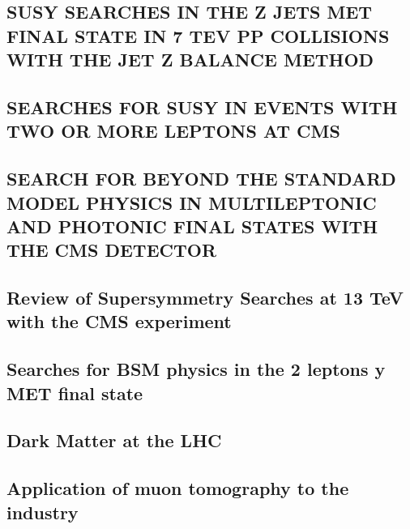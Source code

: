 \documentclass[a4paper, 11pt, twoside, openright]{report}
\begin{document}
\subsection{SUSY SEARCHES IN THE Z JETS MET FINAL STATE IN 7 TEV PP COLLISIONS WITH THE JET Z BALANCE METHOD}

\subsection{SEARCHES FOR SUSY IN EVENTS WITH TWO OR MORE LEPTONS AT CMS}

\subsection{SEARCH FOR BEYOND THE STANDARD MODEL PHYSICS IN MULTILEPTONIC AND PHOTONIC FINAL STATES WITH THE CMS DETECTOR}

\subsection{Review of Supersymmetry Searches at 13 TeV with the CMS experiment}

\subsection{Searches for BSM physics in the 2 leptons y MET final state}

\subsection{Dark Matter at the LHC}

\subsection{Application of muon tomography to the industry}

\end{document}
